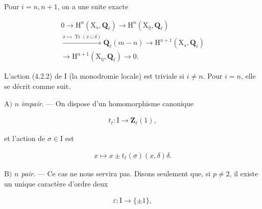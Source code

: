 \documentclass[10pt,leqno]{article}
\begin{document}
\noindent Pour \(i=n,n+1\), on a une suite exacte\par

\begin{equation*}\begin{gathered}0 \longrightarrow  \mathrm{H}^{n}(\mathrm{X}_{s},\mathbf{Q}_{\ell }) \longrightarrow  \mathrm{H}^{n}(\mathrm{X}_{\overline{\eta }},\mathbf{Q}_{\ell }) \\ \xrightarrow{x\longmapsto \operatorname{Tr}(x\cup \delta )} \mathbf{Q}_{\ell }(m- n) \longrightarrow  \mathrm{H}^{n+1}(\mathrm{X}_{s},\mathbf{Q}_{\ell }) \\ \longrightarrow  \mathrm{H}^{n+1}(\mathrm{X}_{\overline{\eta }},\mathbf{Q}_{\ell }) \longrightarrow  0.\end{gathered}\tag{4.3.3}\end{equation*}

\noindent L’action (4.2.2) de \(\mathrm{I}\) (la monodromie locale) est triviale si \(i\ne n\). Pour \(i=n\), elle se décrit comme suit.\par

\noindent \(\mathrm{A})\) \emph{\(n\) impair}. — On dispose d’un homomorphisme canonique\par

\begin{equation*}\begin{gathered}t_{\ell } : \mathrm{I} \longrightarrow  \mathbf{Z}_{\ell }(1),\end{gathered}\end{equation*}

\noindent et l’action de \(\sigma \in \mathrm{I}\) est\par

\begin{equation*}\begin{gathered}x \longmapsto  x \pm  t_{\ell }(\sigma )(x,\delta )\delta .\end{gathered}\end{equation*}

\clearpage

\label{physical-18}\par\smallskip

\noindent \(\mathrm{B})\) \emph{\(n\) pair}. — Ce cas ne nous servira pas. Disons seulement que, si \(p\ne 2\), il existe un unique caractère d’ordre deux\par

\begin{equation*}\begin{gathered}\varepsilon  : \mathrm{I} \longrightarrow  \{\pm 1\},\end{gathered}\end{equation*}
\end{document}
